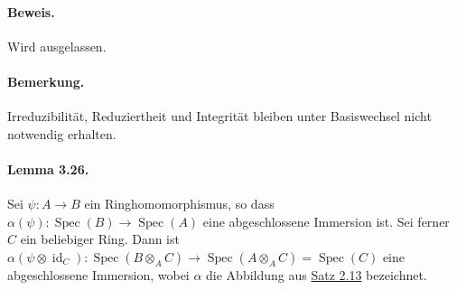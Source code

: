 \documentclass[11pt,b5paper,openany]{memoir}
\begin{document}
\paragraph{Beweis.} Wird ausgelassen.

\paragraph{Bemerkung.} Irreduzibilität, Reduziertheit und Integrität bleiben unter Basiswechsel nicht notwendig erhalten.

\paragraph{Lemma 3.26.}\label{3.26} Sei $\psi:A\to B$ ein Ringhomomorphismus, so dass $\alpha(\psi):\operatorname{Spec}(B)\to\operatorname{Spec}(A)$ eine abgeschlossene Immersion ist. Sei ferner $C$ ein beliebiger Ring. Dann ist $\alpha(\psi\otimes\operatorname{id}_C):\operatorname{Spec}(B\otimes_AC)\to\operatorname{Spec}(A\otimes_AC)=\operatorname{Spec}(C)$ eine abgeschlossene Immersion, wobei $\alpha$ die Abbildung aus \hyperref[2.13]{Satz 2.13} bezeichnet.
\end{document}
